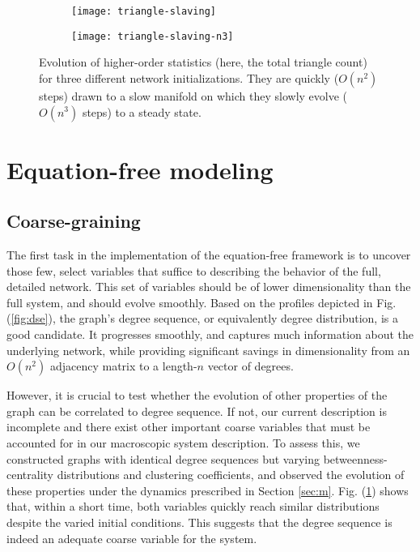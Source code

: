 \documentclass[epjST, final]{svjour}
\begin{document}
\begin{onehalfspace}
\begin{figure}[th!]
  \vspace{-5mm}
  \centering
  \begin{subfigure}[t]{0.49\textwidth}
    \centering
    \texttt{[image: triangle-slaving]}
    \subcaption{\label{fig:sv-n2}}
  \end{subfigure} %
  \begin{subfigure}[t]{0.49\textwidth}
    \centering
    \texttt{[image: triangle-slaving-n3]}
    \subcaption{\label{fig:sv-n3}}
  \end{subfigure}
  \caption{Evolution of higher-order statistics (here, the total
    triangle count) for three different network initializations. They
    are quickly ($O(n^2)$ steps) drawn to a slow manifold on which
    they slowly evolve ($O(n^3)$ steps) to a steady
    state. \label{fig:sv}}
\end{figure}


\section{Equation-free modeling}
\label{sec:ef}

\subsection{Coarse-graining}

The first task in the implementation of the equation-free framework is to uncover those few, select variables that suffice to describing the behavior of the full, detailed network. This set of variables should be of lower dimensionality than the full system, and should evolve smoothly. Based on the profiles depicted in Fig. (\ref{fig:dse}), the graph's degree sequence, or equivalently degree distribution, is a good candidate. It progresses smoothly, and captures much information about the underlying network, while providing significant savings in dimensionality from an $O(n^2)$ adjacency matrix to a length-$n$ vector of degrees. \par

However, it is crucial to test whether the evolution of other properties of the graph can be correlated to degree sequence. If not, our current description is incomplete and there exist other  important coarse variables that must be accounted for in our macroscopic system description. To assess this, we constructed graphs with identical degree sequences but varying betweenness-centrality distributions and clustering coefficients, and observed the evolution of these properties under the dynamics prescribed in Section \ref{sec:m}. Fig. (\ref{fig:sv}) shows that, within a short time, both variables quickly reach similar distributions despite the varied initial conditions. This suggests that the degree sequence is indeed an adequate coarse variable for the system. \par


\end{onehalfspace}
\end{document}
